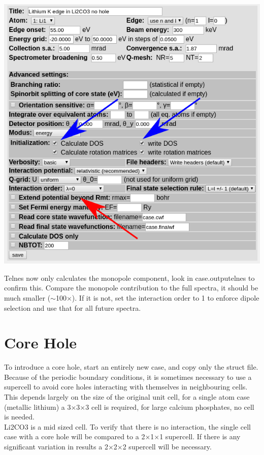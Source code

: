 \documentclass[12pt]{article}
\begin{document}
\includegraphics[scale=0.5]{./images/innes_monopole.png}

Telnes now only calculates the monopole component, look in case.outputelnes to confirm this.  Compare the monopole contribution to the full spectra, it should be much smaller ($\sim$100$\times$).  If it is not, set the interaction order to 1 to enforce dipole selection and use that for all future spectra.


\section{Core Hole}
To introduce a core hole, start an entirely new case, and copy only the struct file.  Because of the periodic boundary conditions, it is sometimes necessary to use a supercell to avoid core holes interacting with themselves in neighbouring cells. This depends largely on the size of the original unit cell, for a single atom case (metallic lithium) a 3$\times$3$\times$3 cell is required, for large calcium phosphates, no cell is needed. \\

Li2CO3 is a mid sized cell.  To verify that there is no interaction, the single cell case with a core hole will be compared to a 2$\times$1$\times$1 supercell.  If there is any significant variation in results a 2$\times$2$\times$2 supercell will be necessary.  \\
\end{document}
